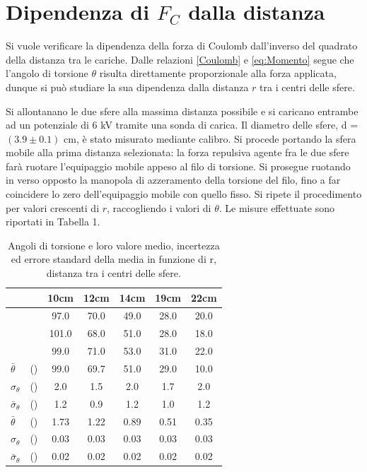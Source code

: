 \section{Dipendenza di \boldmath $F_C$ dalla distanza}
Si vuole verificare la dipendenza della forza di Coulomb dall'inverso del quadrato della distanza tra le cariche. Dalle relazioni \eqref{Coulomb} e \eqref{eq:Momento} segue che l'angolo di torsione $\theta$ risulta direttamente proporzionale alla forza applicata, dunque si può studiare la sua dipendenza dalla distanza $r$ tra i centri delle sfere.

Si allontanano le due sfere alla massima distanza possibile e si caricano entrambe ad un potenziale di 6 kV tramite una sonda di carica. Il diametro delle sfere, d = $(3.9 \pm 0.1)$ cm, è stato misurato mediante calibro. Si procede portando la sfera mobile alla prima distanza selezionata: la forza repulsiva agente fra le due sfere farà ruotare l'equipaggio mobile appeso al filo di torsione. Si prosegue ruotando in verso opposto la manopola di azzeramento della torsione del filo, fino a far coincidere lo zero dell'equipaggio mobile con quello fisso. Si ripete il procedimento per valori  crescenti di $r$, raccogliendo i valori di $\theta$. Le misure effettuate sono riportati in Tabella 1. 

\begin{table}[H]
\centering
\begin{tabular}{l l *{5}{S[table-format=3.2, table-number-alignment=center]}} 
\toprule
& & {\textbf{10cm}} & {\textbf{12cm}} & {\textbf{14cm}} & {\textbf{19cm}} & {\textbf{22cm}} \\
\midrule
& & 97.0 & 70.0 & 49.0 & 28.0 & 20.0 \\
& & 101.0 & 68.0 & 51.0 & 28.0 & 18.0 \\
& & 99.0 & 71.0 & 53.0 & 31.0 & 22.0 \\
\midrule
{\textbf{\boldmath$\bar{\theta}$}}         & {()}    & 99.0 & 69.7 & 51.0 & 29.0 & 10.0 \\
{\textbf{\boldmath$\sigma_{\theta}$}}      & {()}    & 2.0  & 1.5 & 2.0 & 1.7 & 2.0 \\
{\textbf{\boldmath$\bar{\sigma}_{\theta}$}} & {()}    & 1.2  & 0.9 & 1.2 & 1.0 & 1.2 \\
\midrule
{\textbf{\boldmath$\bar{\theta}$}}         & {()}    & 1.73 & 1.22 & 0.89 & 0.51 & 0.35 \\
{\textbf{\boldmath$\sigma_{\theta}$}}      & {()}    & 0.03  & 0.03 & 0.03 & 0.03 & 0.03 \\
{\textbf{\boldmath$\bar{\sigma}_{\theta}$}} & {()}    & 0.02  & 0.02 & 0.02 & 0.02 & 0.02 \\
\bottomrule
\end{tabular}
\caption{Angoli di torsione e loro valore medio, incertezza ed errore standard della media in funzione di r, distanza tra i centri delle sfere.}
\label{tab:distanza}
\end{table}

